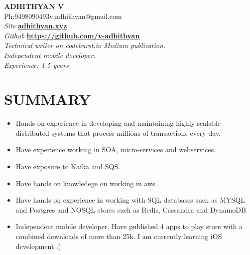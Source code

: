 \documentclass[11pt,a4paper]{article}
\begin{document}
\begin{center}
{\LARGE{\textbf{ADHITHYAN V}}}\\
{Ph:9498090493\hfill}{\hfill v.adhithyan@gmail.com} \\
\emph{Site} \textbf{\href{adhithyan.xyz}{adhithyan.xyz}} \\
\emph{Github} \textbf{\href{https://github.com/v-adhithyan}{https://github.com/v-adhithyan}}\\
\emph{Technical writer on codeburst.io Medium publication.}\\
\emph{Independent mobile developer.}\\
\emph{Experience: 1.5 years}
\noindent\makebox[\linewidth]{\rule{\paperwidth}{0.4pt}}
\end{center}
\section*{SUMMARY}
\begin{itemize}[noitemsep]
\item Hands on experience in developing and maintaining highly scalable distributed systems that process millions of transactions every day.
\item Have experience working in SOA, micro-services and webservices.
\item Have exposure to Kafka and SQS.
\item Have hands on knowledege on working in aws.
\item Have hands on experience in working with SQL databases such as MYSQL and Postgres and NOSQL stores such as Redis, Cassandra and DynamoDB
\item Independent mobile developer. Have published 4 apps to play store with a combined downloads of more than 25k. I am currently learning iOS development :)
\end{itemize}
\end{document}
